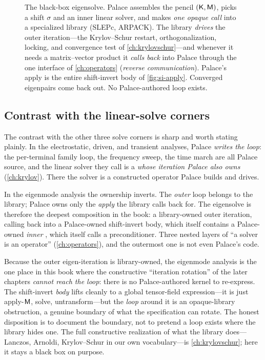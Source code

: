 \begin{figure}[t]
\caption[The eigensolver as a black box with reverse-communication callbacks]{The
black-box eigensolve. Palace assembles the pencil $(\mathsf{K},\mathsf{M})$, picks a shift
$\sigma$ and an inner linear solver, and makes \emph{one opaque call} into a
specialized library (SLEPc, ARPACK). The library \emph{drives} the outer
iteration---the Krylov--Schur restart, orthogonalization, locking, and convergence
test of \cref{ch:krylovschur}---and whenever it needs a matrix--vector product it
\emph{calls back} into Palace through the one  interface of
\cref{ch:operators} (\emph{reverse communication}). Palace's apply is the entire
shift-invert body of \cref{fig:si-apply}. Converged eigenpairs come back out. No
Palace-authored loop exists.}
\label{fig:blackbox-rci}
\end{figure}

\subsection{Contrast with the linear-solve corners}

The contrast with the other three solve corners is sharp and worth stating
plainly. In the electrostatic, driven, and transient analyses, Palace
\emph{writes the loop}: the per-terminal family loop, the frequency sweep, the
time march are all Palace source, and the linear solver they call is a
 \emph{whose iteration Palace also owns} (\cref{ch:krylov}).
There the solver is a constructed operator Palace builds and drives.

In the eigenmode analysis the ownership inverts. The \emph{outer} loop belongs to
the library; Palace owns only the \emph{apply} the library calls back for. The
eigensolve is therefore the deepest composition in the book: a library-owned outer
iteration, calling back into a Palace-owned shift-invert body, which itself
contains a Palace-owned \emph{inner} , which itself calls a
preconditioner. Three nested layers of ``a solver is an operator''
(\cref{ch:operators}), and the outermost one is not even Palace's code.

\begin{pitfall}
Because the outer eigen-iteration is library-owned, the eigenmode analysis is the
one place in this book where the constructive ``iteration rotation'' of the later
chapters \emph{cannot reach the loop}: there is no Palace-authored kernel to
re-express. The shift-invert \emph{body} lifts cleanly to a global tensor-field
expression---it is just apply-$\mathsf{M}$, solve, untransform---but the \emph{loop}
around it is an opaque-library obstruction, a genuine boundary of what the
specification can rotate. The honest disposition is to document the boundary, not
to pretend a loop exists where the library hides one. The full constructive
realization of what the library does---Lanczos, Arnoldi, Krylov--Schur in our own
vocabulary---is \cref{ch:krylovschur}; here it stays a black box on purpose.
\end{pitfall}

